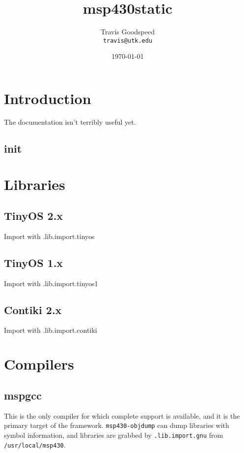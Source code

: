 \documentclass[]{book}
\title{msp430static}
\author{Travis Goodspeed\\{\tt travis@utk.edu}}
\date{\today}
\begin{document}
\maketitle

\chapter{Introduction}

The documentation isn't terribly useful yet.

\section{init}

\chapter{Libraries}

\section{TinyOS 2.x}

Import with {\macro .lib.import.tinyos}

\section{TinyOS 1.x}

Import with {\macro .lib.import.tinyos1}

\section{Contiki 2.x}

Import with {\macro .lib.import.contiki}

\chapter{Compilers}

\section{mspgcc}

This is the only compiler for which complete support is available,
and it is the primary target of the framework.  {\tt msp430-objdump}
can dump libraries with symbol information, and libraries are grabbed
by {\tt .lib.import.gnu} from {\tt /usr/local/msp430}.
\end{document}

